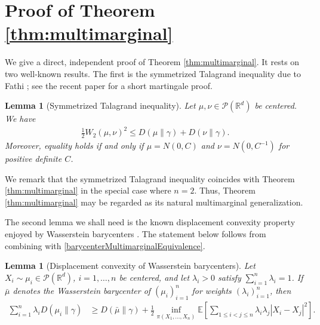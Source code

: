 \documentclass[10pt]{article}
\newtheorem{lemma}[theorem]{Lemma}
\newcommand{\EE}{\mathbb{E}}
\newcommand{\R}{\mathbb{R}}
\begin{document}
\section{Proof of Theorem \ref{thm:multimarginal}}\label{sec:BarycenterProof}
We give a direct, independent proof of Theorem \ref{thm:multimarginal}.  It rests on two well-known results.  The first is the symmetrized Talagrand inequality due to Fathi \cite{MF}; see the recent paper \cite{CFM} for a short martingale proof. 
\begin{lemma}[Symmetrized Talagrand inequality]\label{lem:SymmTal}
Let $\mu, \nu \in \mathcal{P}(\R^d)$ be centered.  We have  
\begin{align}
\frac{1}{2} W_2(\mu, \nu)^2 \leq     D(\mu \| \gamma) + D(\nu \| \gamma) . \label{eq:symmTalagrand}
\end{align}
Moreover,  equality holds if and only if $\mu =  N(0,C)$ and $\nu =  N(0,C^{-1})$ for positive definite $C$.  
\end{lemma}
We remark that the symmetrized Talagrand inequality coincides with  Theorem   \ref{thm:multimarginal} in the special case where $n=2$.  Thus, Theorem  \ref{thm:multimarginal} may be regarded as its natural  multimarginal generalization.

The second  lemma we shall need is the known displacement convexity property enjoyed by Wasserstein barycenters  \cite[Proposition 7.7]{AC}.  The statement below follows from  combining \cite[Eq. (6.4)]{KW}  with \eqref{barycenterMultimarginalEquivalence}.  
\begin{lemma}[Displacement convexity of Wasserstein barycenters]
Let $X_i \sim \mu_i \in \mathcal{P}(\R^d)$, $i=1, \dots ,n $ be centered, and let $\lambda_i >  0$ satisfy $\sum_{i=1}^n \lambda_i = 1$.  If $\bar{\mu}$ denotes the  Wasserstein barycenter of $(\mu_i)_{i=1}^n$ for weights $(\lambda_i)_{i=1}^n$, then 
\begin{align}
\sum_{i=1}^n \lambda_i D(\mu_i\| \gamma )  &\geq  
  D(\bar{\mu} \| \gamma)  + \frac{1}{2} \inf_{\pi(X_1, \dots, X_{n})} \EE\left[  \sum_{1 \leq i < j \leq n} \lambda_i \lambda_j |X_i - X_j|^2  \right] .  \label{eq:dispConvexityGen}
\end{align}
\end{lemma}
\end{document}
